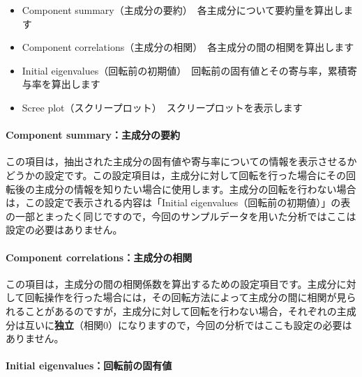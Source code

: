 \documentclass[
  12pt,
  a5jpaper,
  lualatex, ja=standard]{bxjsbook}
\providecommand{\tightlist}{%
  \setlength{\itemsep}{0pt}\setlength{\parskip}{0pt}}
\newenvironment{jmvsettings}{%
	\begin{center}%
	\begin{tcolorbox}[%
		title=設定項目,
		colframe=gmoji,
		colbacktitle=gmoji,
		colback=gmoji!2!white,
		breakable,
		width=.9\textwidth,
		]\small\addtolength{\leftmargini}{-3\labelsep}%
	}%
	{\end{tcolorbox}\end{center}}
\begin{document}
\begin{jmvsettings}

\begin{itemize}
\tightlist
\item
  Component summary（主成分の要約）　各主成分について要約量を算出します
\item
  Component correlations（主成分の相関）　各主成分の間の相関を算出します
\item
  Initial eigenvalues（回転前の初期値）　回転前の固有値とその寄与率，累積寄与率を算出します
\item
  Scree plot（スクリープロット）　スクリープロットを表示します
\end{itemize}

\end{jmvsettings}

\hypertarget{component-summaryux4e3bux6210ux5206ux306eux8981ux7d04}{%
\paragraph*{Component summary：主成分の要約}\label{component-summaryux4e3bux6210ux5206ux306eux8981ux7d04}}

この項目は，抽出された主成分の固有値や寄与率についての情報を表示させるかどうかの設定です。この設定項目は，主成分に対して回転を行った場合にその回転後の主成分の情報を知りたい場合に使用します。主成分の回転を行わない場合は，この設定で表示される内容は「Initial eigenvalues（回転前の初期値）」の表の一部とまったく同じですので，今回のサンプルデータを用いた分析ではここは設定の必要はありません。

\hypertarget{component-correlationsux4e3bux6210ux5206ux306eux76f8ux95a2}{%
\paragraph*{Component correlations：主成分の相関}\label{component-correlationsux4e3bux6210ux5206ux306eux76f8ux95a2}}

この項目は，主成分の間の相関係数を算出するための設定項目です。主成分に対して回転操作を行った場合には，その回転方法によって主成分の間に相関が見られることがあるのですが，主成分に対して回転を行わない場合，それぞれの主成分は互いに\textbf{独立}（相関0）になりますので，今回の分析ではここも設定の必要はありません。

\hypertarget{initial-eigenvaluesux56deux8ee2ux524dux306eux56faux6709ux5024}{%
\paragraph*{Initial eigenvalues：回転前の固有値}\label{initial-eigenvaluesux56deux8ee2ux524dux306eux56faux6709ux5024}}
\end{document}
